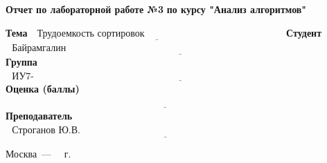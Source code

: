 \begin{titlepage}
    \begin{center}
        \Large\textbf{Отчет по лабораторной работе №3}
        \Large\textbf{по курсу "Анализ алгоритмов"}\newline
    \end{center}

    \noindent\textbf{Тема} $\underline{\text{~~Трудоемкость сортировок~~~~~~~~~~~~~~~~~~~~~~~~~~~~~~~~~~~~~~~~~~~}}$\newline\newline\newline
    \noindent\textbf{Студент} $\underline{\text{~~Байрамгалин Я.Р.~~~~~~~~~~~~~~~~~~~~~~~~~~~~~~~~~~~~~~~~~~~~~~~~~~~~~~~~~~~~~~~~~~~~~~~~~~~~~~~~~~~~}}$\newline\newline
    \noindent\textbf{Группа} $\underline{\text{~~ИУ7-53Б~~~~~~~~~~~~~~~~~~~~~~~~~~~~~~~~~~~~~~~~~~~~~~~~~~~~~~~~~~~~~~~~~~~~~~~~~~~~~~~~~~~~~~~~~~~~~~~~~~}}$\newline\newline
    \noindent\textbf{Оценка (баллы)} $\underline{\text{~~~~~~~~~~~~~~~~~~~~~~~~~~~~~~~~~~~~~~~~~~~~~~~~~~~~~~~~~~~~~~~~~~~~~~~~~~~~~~~~~~~~~~~~~~~~~~~~~~~}}$\newline\newline
    \noindent\textbf{Преподаватель} $\underline{\text{~~Строганов Ю.В.~~~~~~~~~~~~~~~~~~~~~~~~~~~~~~~~~~~~~~~~~~~~~~~~~~~~~~~~~~~~~~~~~~~~~~~~~~~~}}$\newline

    \begin{center}
        \vfill
        Москва~---~\the\year
        ~г.
    \end{center}
    \restoregeometry
\end{titlepage}
